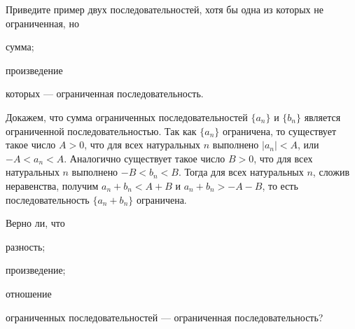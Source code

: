 \documentclass[a4paper, 12pt, num=2426, date=01.09.2020]{listok}
\begin{document}
\begin{problem}[$\mathghost$]
    Приведите пример двух последовательностей, хотя бы одна из которых не ограниченная, но
    \begin{probparts}
        \item сумма;
        \item произведение
    \end{probparts}
    которых --- ограниченная последовательность.
\end{problem}

\begin{example*}
    Докажем, что сумма ограниченных последовательностей $\{a_n\}$ и $\{b_n\}$
    является ограниченной последовательностью.
    Так как $\{a_n\}$ ограничена, то существует такое число $A > 0$,
    что для всех натуральных $n$ выполнено $|a_n| < A$, или $-A < a_n < A$.
    Аналогично существует такое число $B > 0$, что для всех натуральных $n$ выполнено $-B < b_n < B$.
    Тогда для всех натуральных $n$, сложив неравенства,
    получим $a_n + b_n < A + B$ и $a_n + b_n > -A-B$, то есть последовательность $\{a_n + b_n\}$ ограничена.
\end{example*}

\begin{problem}
    Верно ли, что
    \begin{probparts}
        \item разность;
        \item произведение;
        \item отношение
    \end{probparts}
    ограниченных последовательностей --- ограниченная последовательность?
\end{problem}
\end{document}
